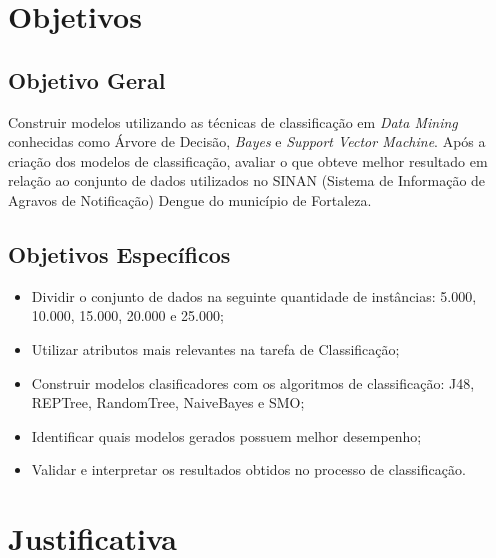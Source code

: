 \documentclass[
	12pt,				%
	openright,			%
	oneside,	
	a4paper,				%
	english,				%
	brazil				%
]{abntex2/abntex2} %
\begin{document}
	\section{Objetivos}
	
		\subsection{Objetivo Geral}

		Construir modelos utilizando as técnicas de classificação em \textit{Data Mining} conhecidas como Árvore de Decisão, \textit{Bayes} e \textit{Support Vector Machine}. Após a criação dos modelos de classificação, avaliar o que obteve melhor resultado em relação ao conjunto de dados utilizados no SINAN (Sistema de Informação de Agravos de Notificação) Dengue do município de Fortaleza. 
		
		\subsection{Objetivos Específicos}
		
		\begin{itemize}
			\item Dividir o conjunto de dados na seguinte quantidade de instâncias: 5.000, 10.000, 15.000, 20.000 e 25.000;
			
			\item Utilizar atributos mais relevantes na tarefa de Classificação;
			
			\item Construir modelos clasificadores com os algoritmos de classificação: J48, REPTree, RandomTree, NaiveBayes e SMO;

			\item Identificar quais modelos gerados possuem melhor desempenho;
			
			\item Validar e interpretar os resultados obtidos no processo de classificação.
		\end{itemize}
		
	\section{Justificativa}
	
\end{document}

